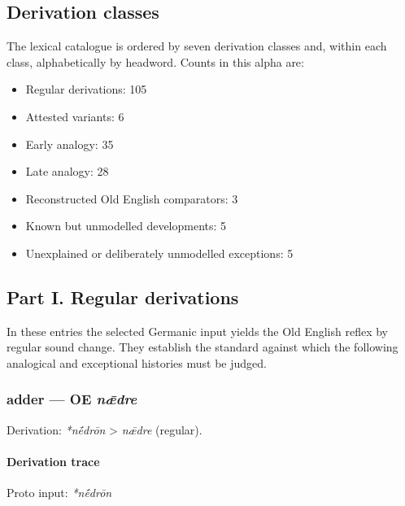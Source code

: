 \documentclass[
  british,
  a4paper,
]{article}
\providecommand{\tightlist}{%
  \setlength{\itemsep}{0pt}\setlength{\parskip}{0pt}}
\begin{document}
\subsection{Derivation classes}\label{derivation-classes}

The lexical catalogue is ordered by seven derivation classes and, within
each class, alphabetically by headword. Counts in this alpha are:

\begin{itemize}
\tightlist
\item
  Regular derivations: 105
\item
  Attested variants: 6
\item
  Early analogy: 35
\item
  Late analogy: 28
\item
  Reconstructed Old English comparators: 3
\item
  Known but unmodelled developments: 5
\item
  Unexplained or deliberately unmodelled exceptions: 5
\end{itemize}

\clearpage

\subsection{Part I. Regular
derivations}\label{part-i.-regular-derivations}

In these entries the selected Germanic input yields the Old English
reflex by regular sound change. They establish the standard against
which the following analogical and exceptional histories must be judged.

\subsubsection{\texorpdfstring{adder --- OE
\emph{nǣdre}}{adder --- OE nǣdre}}\label{adder-oe-nux1e3dre}

Derivation: \emph{*nḗdrōn} \textgreater{} \emph{nǣdre} (regular).

\paragraph{Derivation trace}\label{derivation-trace}

Proto input: \emph{*nḗdrōn}

\begingroup
\setlength{\fboxsep}{6pt}
\end{document}
